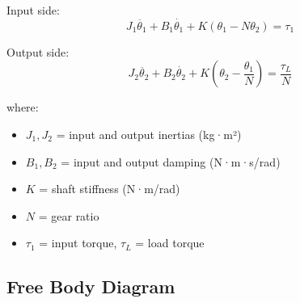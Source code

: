 \documentclass[12pt,letterpaper]{article}
\begin{document}
Input side:
\begin{equation}
J_1\ddot{\theta_1} + B_1\dot{\theta_1} + K(\theta_1 - N\theta_2) = \tau_1
\end{equation}

Output side:
\begin{equation}
J_2\ddot{\theta_2} + B_2\dot{\theta_2} + K(\theta_2 - \frac{\theta_1}{N}) = \frac{\tau_L}{N}
\end{equation}

where:
\begin{itemize}
    \item $J_1, J_2$ = input and output inertias (kg·m²)
    \item $B_1, B_2$ = input and output damping (N·m·s/rad)
    \item $K$ = shaft stiffness (N·m/rad)
    \item $N$ = gear ratio
    \item $\tau_1$ = input torque, $\tau_L$ = load torque
\end{itemize}

\subsection{Free Body Diagram}
\end{document}
